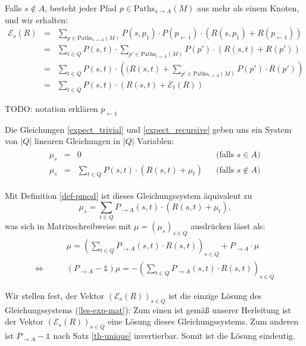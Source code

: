 \documentclass[a4paper]{article}
\theoremstyle{nonumberplain}
\begin{document}
{Falls $s \notin A$, besteht jeder Pfad $p \in \mathrm{Paths}_{s \rightarrow A}(M)$ aus mehr als einem Knoten, und wir erhalten:
\begin{align}
	\mathcal{E}_{s}(R) & = & \sum_{p \in \mathrm{Paths}_{s \rightarrow A}(M)}{P(s,p_1) \cdot P(p_{\leftarrow 1}) \cdot (R(s,p_1) + R(p_{\leftarrow 1}))} \\
	& = & \sum_{t \in Q}{ P(s,t) \cdot \sum_{p' \in \mathrm{Paths}_{t \rightarrow A}(M)}{ P(p') \cdot (R(s,t) + R(p')) } } \\
	& = & \sum_{t \in Q}{ P(s,t) \cdot \left((R(s,t) + \sum_{p' \in \mathrm{Paths}_{t \rightarrow A}(M)}{ P(p') \cdot R(p') } \right) } \\
	& = & \sum_{t \in Q}{ P(s,t) \cdot \left(R(s,t) + \mathcal{E}_{t}(R) \right) } \label{expect_recursive}
\end{align}
\begin{meta}
	TODO: notation erklären $p_{\leftarrow 1}$
\end{meta}
Die Gleichungen \ref{expect_trivial} und \ref{expect_recursive} geben uns ein System von $|Q|$ linearen Gleichungen in $|Q|$ Variablen:
\begin{align}
\begin{aligned}
	\mu_{s} & = & 0 && \text{(falls $s \in A$)} \\
	\mu_{s} & = & \sum_{t \in Q}{ P(s,t) \cdot \left(R(s,t) + \mu_{t} \right) } && \text{(falls $s \notin A$)}
\end{aligned}\label{les-exp}
\end{align}

Mit Definition \ref{def-pmod} ist dieses Gleichungssystem äquivalent zu
\begin{equation}
	\mu_s = \sum_{t \in Q}{ P_{\rightarrow A}(s,t) \cdot \left(R(s,t) + \mu_{t} \right) }\text{,}
\end{equation}
was sich in Matrixschreibweise mit $\mu = (\mu_s)_{s \in Q }$ ausdrücken lässt als:
\begin{align}
	& \mu = \left(\sum_{t \in Q}{ P_{\rightarrow A}(s,t) \cdot R(s,t) }\right)_{s \in Q} + P_{\rightarrow A} \cdot \mu \\
	\Longleftrightarrow	\qquad & (P_{\rightarrow A} - \mathbb{1}) \mu = - \left(\sum_{t \in Q}{ P_{\rightarrow A}(s,t) \cdot R(s,t) }\right)_{s \in Q}\label{les-exp-mat}
\end{align}

Wir stellen fest, der Vektor $(\mathcal{E}_{s}(R))_{s \in Q}$ ist die einzige Lösung des Gleichungssystems (\ref{les-exp-mat}):
Zum einen ist gemäß unserer Herleitung ist der Vektor $(\mathcal{E}_{s}(R))_{s \in Q}$ eine Lösung dieses Gleichungssystems. Zum anderen ist $P_{\rightarrow A} - \mathbb{1}$ nach Satz \ref{th-unique} invertierbar. Somit ist die Lösung eindeutig.

}
\end{document}
